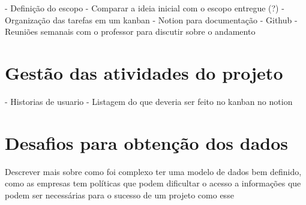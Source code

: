 - Definição do escopo - Comparar a ideia inicial com o escopo entregue (?)
- Organização das tarefas em um kanban
- Notion para documentação
- Github
- Reuniões semanais com o professor para discutir sobre o andamento


\section[Gestão das atividades do projeto]{Gestão das atividades do projeto}
- Historias de usuario
- Listagem do que deveria ser feito no kanban no notion

\section[Desafios para obtenção dos dados]{Desafios para obtenção dos dados}
Descrever mais sobre como foi complexo ter uma modelo de dados bem definido, como as empresas tem políticas que podem dificultar o acesso a informações que podem ser necessárias para o sucesso de um projeto como esse
